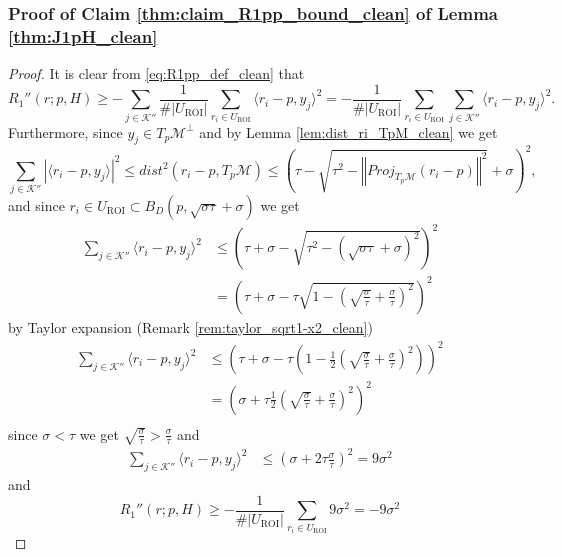 \documentclass[12pt]{article}
\theoremstyle{remark}
\newcommand{\MM}{\mathcal{M}}
\newcommand{\KK}{\mathcal{K}}
\newcommand{\abs}[1]{\left\vert #1 \right\vert}
\newcommand{\norm}[1]{\left\Vert #1 \right\Vert}
\newcommand{\lrangle}[1]{\langle #1 \rangle}
\newcommand{\lrbrackets}[1]{\left( #1 \right)}
\begin{document}
\begin{appendices}
\subsubsection{Proof of Claim \ref{thm:claim_R1pp_bound_clean} of  Lemma \ref{thm:J1pH_clean}}\label{sec:proof_claim_R1pp_bound_clean}

\begin{proof} 
It is clear from \eqref{eq:R1pp_def_clean} that
\[
R_1''(r; p, H) \geq
- \sum\limits_{j\in\KK''} \frac{1}{\#|U_\textrm{ROI}|}\sum\limits_{r_i\in U_\textrm{ROI}}   \langle r_i - p, {y}_j \rangle^2 =  - \frac{1}{\#|U_\textrm{ROI}|}\sum\limits_{r_i\in U_\textrm{ROI}}\sum\limits_{j\in\KK''}\langle r_i - p, {y}_j \rangle^2
.\]
Furthermore, since $y_j\in T_p\MM^\perp$ and by Lemma \ref{lem:dist_ri_TpM_clean} we get 
\[
\sum\limits_{j\in\KK''}\abs{\lrangle{r_i - p, y_j}}^2 \leq dist^2(r_i - p, T_p\MM) \leq \left(\tau - \sqrt{\tau^2 - \norm{Proj_{T_p\MM}(r_i- p) }^2} + \sigma\right)^2 
,\]
and since $r_i\in U_\textrm{ROI} \subset B_D(p, \sqrt{\sigma\tau} + \sigma)$ we get
\begin{align*}
     \sum\limits_{j\in\KK''}\langle r_i - p,y_j \rangle^2 
     & \leq 
	\left(\tau+\sigma-\sqrt{\tau^2-(\sqrt{\sigma\tau}+\sigma)^2}\right)^2 \\
	& = \lrbrackets{\tau + \sigma - \tau\sqrt{1 - \lrbrackets{\sqrt{\frac{\sigma}{\tau}} + \frac{\sigma}{\tau} }^2 }}^2
\end{align*}
by Taylor expansion (Remark \ref{rem:taylor_sqrt1-x2_clean})
\begin{align*}
     \sum\limits_{j\in\KK''}\langle r_i - p,y_j \rangle^2 
	& \leq 
	\lrbrackets{\tau + \sigma - \tau\lrbrackets{1 - \frac{1}{2}\lrbrackets{\sqrt{\frac{\sigma}{\tau}} + \frac{\sigma}{\tau} }^2}}^2 \\
	&=
	\lrbrackets{\sigma + \tau \frac{1}{2}\lrbrackets{\sqrt{\frac{\sigma}{\tau}} + \frac{\sigma}{\tau} }^2}^2 \\
\end{align*} 
since $ \sigma < \tau $ we get $\sqrt{\frac{\sigma}{\tau}} > \frac{\sigma}{\tau} $ and
\begin{align}\label{eq:ri_yk_bound_s_square_clean}
     \sum\limits_{j\in\KK''}\langle r_i - p,y_j \rangle^2 
	& \leq 
	\lrbrackets{\sigma + 2\tau \frac{\sigma}{\tau}}^2 = 9 \sigma^2
\end{align}
and
\begin{equation*}
R_1''(r; p, H) \geq
-  \frac{1}{\#|U_\textrm{ROI}|}\sum\limits_{r_i\in U_\textrm{ROI}}   9 \sigma^2 =  -9 \sigma^2
\end{equation*}


\end{proof}
\end{appendices}
\end{document}

